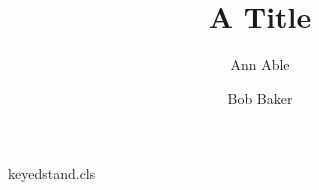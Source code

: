 \begin{filecontents*}[overwrite]{keyedstand.cls}
\def\addresses{}
\def\authors{}
\def\@exname#1{\expandafter\csname #1\endcsname}
\renewcommand{\author}[2][]{\expandafter\gdef\csname @#1\endcsname{#1}%
  \g@addto@macro\authors{#2\textsuperscript{#1} }\g@addto@macro\addresses{\author{}{}}}
\newcommand{\address}[2][]{\g@addto@macro\addresses{\address{}{\textsuperscript{\@exname{@#1}}#2}}}
\def\@setaddresses{\def\author##1##2{}\def\address##1##2{\par\noindent ##2\par}\addresses}
\def\maketitle{{\Large\@title\par}{\authors\par}\@setaddresses}
\end{filecontents*}
\documentclass{keyedstand}

\title{A Title}
\author[ua]{Ann Able}
\noindent\address[ua]{Univ A, Town}
\author[ub]{Bob Baker}
\address[ub]{Univ B, City}
\maketitle
Body.

